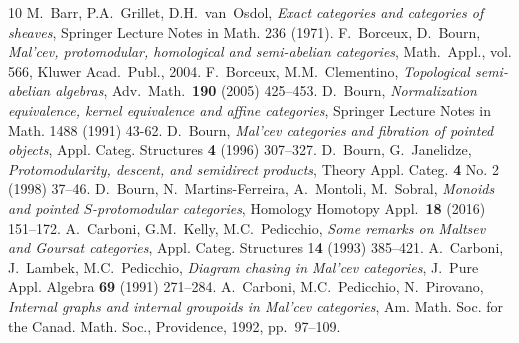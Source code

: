 \documentclass[10pt,a4paper]{amsart}
\theoremstyle{plain}
\theoremstyle{definition}
\theoremstyle{remark}
\begin{document}
\begin{thebibliography}{10}
 M.~Barr, P.A.~Grillet, D.H.~van~Osdol, \emph{Exact categories and categories of sheaves}, Springer Lecture Notes in Math. 236 (1971).
 F.~Borceux, D.~Bourn, \emph{Mal'cev, protomodular, homological and semi-abelian categories}, Math.~Appl., vol. 566, Kluwer Acad.~Publ., 2004.
 F.~Borceux, M.M.~Clementino, \emph{Topological semi-abelian algebras}, Adv.~Math.~\textbf{190} (2005) 425--453.
 D.~Bourn, \emph{Normalization equivalence, kernel equivalence and affine categories}, Springer Lecture Notes in Math. 1488 (1991) 43-62.
 D.~Bourn, \emph{Mal'cev categories and fibration of pointed objects}, Appl. Categ. Structures \textbf{4} (1996) 307--327.
 D.~Bourn, G.~Janelidze, \emph{Protomodularity, descent, and semidirect products}, Theory Appl. Categ. \textbf{4} No. 2 (1998) 37--46.
 D.~Bourn, N.~Martins-Ferreira, A.~Montoli, M.~Sobral, \emph{Monoids and pointed $S$-protomodular
categories}, Homology Homotopy Appl.~\textbf{18} (2016) 151--172.
 A.~Carboni, G.M.~Kelly, M.C.~Pedicchio, \emph{Some remarks on {M}altsev and {G}oursat categories}, Appl. Categ. Structures 1\textbf{4} (1993) 385--421.
 A.~Carboni, J.~Lambek, M.C.~Pedicchio, \emph{Diagram chasing in {M}al'cev categories}, J.~Pure Appl. Algebra \textbf{69} (1991) 271--284.
 A.~Carboni, M.C.~Pedicchio,  N.~Pirovano, \emph{Internal graphs and internal groupoids in {M}al'cev categories}, Am. Math. Soc. for the Canad. Math. Soc., Providence, 1992, pp.~97--109.

\end{thebibliography}
\end{document}

